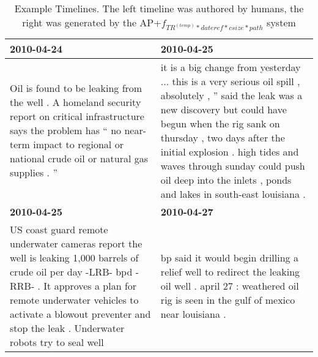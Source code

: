\documentclass[a4paper,BCOR=10mm]{report}
\numberwithin{lemma}{chapter}
\numberwithin{definition}{chapter}
\begin{document}
\begin{table}
\begin{tabularx}{1.2\textwidth}{|X|X|}
\textbf{2010-04-24} & \textbf{2010-04-25} \\\hline
Oil is found to be leaking from the well . \newline A homeland security report on critical infrastructure says the problem has `` no near-term impact to regional or national crude oil or natural gas supplies . '' & it is a big change from yesterday ... this is a very serious oil spill , absolutely , '' said the leak was a new discovery but could have begun when the rig sank on thursday , two days after the initial explosion . \newline high tides and waves through sunday could push oil deep into the inlets , ponds and lakes in south-east louisiana . \\\hline
\textbf{2010-04-25} & \textbf{2010-04-27} \\\hline
US coast guard remote underwater cameras report the well is leaking 1,000 barrels of crude oil per day -LRB- bpd -RRB- . \newline It approves a plan for remote underwater vehicles to activate a blowout preventer and stop the leak . \newline Underwater robots try to seal well & bp said it would begin drilling a relief well to redirect the leaking oil well . \newline april 27 : weathered oil rig is seen in the gulf of mexico near louisiana . \\\hline
\end{tabularx}
\caption{Example Timelines. The left timeline was authored by humans, the right was generated by the AP+$f_{TR^{(temp)} * dateref * csize * path}$ system}
\label{tab:tlbp}
\end{table}
\end{document}
